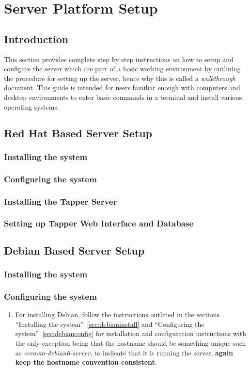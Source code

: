 \chapter{\cernvmreleasetesting Server Platform Setup}
\label{sec:serversetup}

\section{Introduction}
This section provides complete step by step instructions on how to setup and configure the \tapper server which are part of a basic working
\releasetesting environment by outlining the procedure for setting up the server, hence why this is called a \emph{walkthrough} document. 
This guide is intended for users familiar enough with computers and desktop environments to enter basic commands in a terminal and install 
various operating systems. 

\section{Red Hat Based Server Setup}
\subsection{Installing the system}
\subsection{Configuring the system}
\subsection{Installing the Tapper Server}
\subsection{Setting up Tapper Web Interface and Database}

\section{Debian Based Server Setup}
\subsection{Installing the system}
\subsection{Configuring the system}
\flushleft
\begin{enumerate}
\item For installing Debian, follow the instructions outlined in the sections ``Installing the system''~\ref{sec:debianinstall} and
``Configuring the system''~\ref{sec:debianconfig} for installation and configuration instructions with the only exception being that
the hostname should be something unique such as \emph{cernvm-debian6-server}, to indicate that it is running the \tapper server, 
{\bf again keep the hostname convention consistent}.
\end{enumerate}

